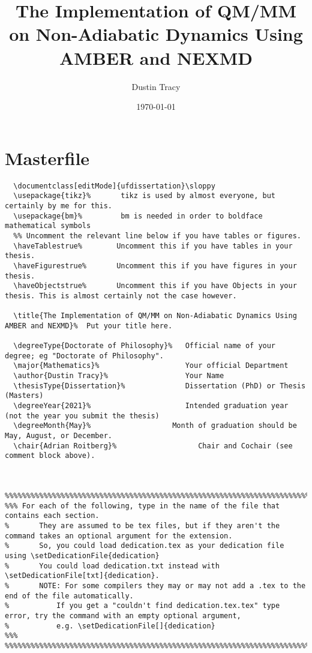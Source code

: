 \documentclass[11pt]{article}
\author{Dustin Tracy}
\date{\today}
\title{The Implementation of QM/MM on Non-Adiabatic Dynamics Using AMBER and NEXMD}
\begin{document}
\maketitle
\tableofcontents


\section*{Masterfile}
\label{sec:orgcd39261}
\begin{verbatim}
  \documentclass[editMode]{ufdissertation}\sloppy
  \usepackage{tikz}%       tikz is used by almost everyone, but certainly by me for this.
  \usepackage{bm}%         bm is needed in order to boldface mathematical symbols
  %% Uncomment the relevant line below if you have tables or figures.
  \haveTablestrue%        Uncomment this if you have tables in your thesis.
  \haveFigurestrue%       Uncomment this if you have figures in your thesis.
  \haveObjectstrue%       Uncomment this if you have Objects in your thesis. This is almost certainly not the case however.

  \title{The Implementation of QM/MM on Non-Adiabatic Dynamics Using AMBER and NEXMD}%  Put your title here.

  \degreeType{Doctorate of Philosophy}%   Official name of your degree; eg "Doctorate of Philosophy".
  \major{Mathematics}%                    Your official Department
  \author{Dustin Tracy}%                  Your Name
  \thesisType{Dissertation}%              Dissertation (PhD) or Thesis (Masters)
  \degreeYear{2021}%                      Intended graduation year (not the year you submit the thesis)
  \degreeMonth{May}%                   Month of graduation should be May, August, or December.
  \chair{Adrian Roitberg}%                   Chair and Cochair (see comment block above).


  %%%%%%%%%%%%%%%%%%%%%%%%%%%%%%%%%%%%%%%%%%%%%%%%%%%%%%%%%%%%%%%%%%%%%%%%%%%%%%%% 
%%% For each of the following, type in the name of the file that contains each section. 
%       They are assumed to be tex files, but if they aren't the command takes an optional argument for the extension.
%       So, you could load dedication.tex as your dedication file using \setDedicationFile{dedication}
%       You could load dedication.txt instead with \setDedicationFile[txt]{dedication}.
%       NOTE: For some compilers they may or may not add a .tex to the end of the file automatically.
%           If you get a "couldn't find dedication.tex.tex" type error, try the command with an empty optional argument,
%           e.g. \setDedicationFile[]{dedication}
%%%
%%%%%%%%%%%%%%%%%%%%%%%%%%%%%%%%%%%%%%%%%%%%%%%%%%%%%%%%%%%%%%%%%%%%%%%%%%%%%%%%


\end{verbatim}
\end{document}
